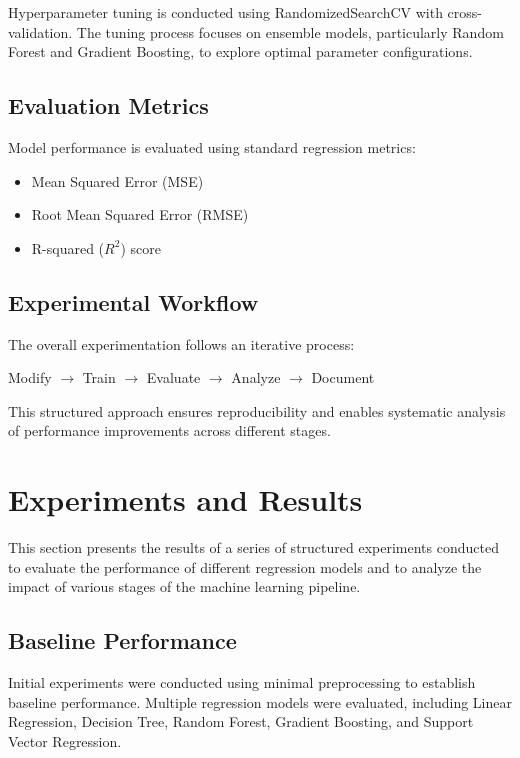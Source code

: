 \documentclass[conference]{IEEEtran}
\begin{document}
Hyperparameter tuning is conducted using RandomizedSearchCV with cross-validation. The tuning process focuses on ensemble models, particularly Random Forest and Gradient Boosting, to explore optimal parameter configurations.

\subsection{Evaluation Metrics}

Model performance is evaluated using standard regression metrics:

\begin{itemize}
\item Mean Squared Error (MSE)
\item Root Mean Squared Error (RMSE)
\item R-squared ($R^2$) score
\end{itemize}

\subsection{Experimental Workflow}

The overall experimentation follows an iterative process:

\begin{center}
Modify $\rightarrow$ Train $\rightarrow$ Evaluate $\rightarrow$ Analyze $\rightarrow$ Document
\end{center}

This structured approach ensures reproducibility and enables systematic analysis of performance improvements across different stages.

\section{Experiments and Results}

This section presents the results of a series of structured experiments conducted to evaluate the performance of different regression models and to analyze the impact of various stages of the machine learning pipeline.

\subsection{Baseline Performance}

Initial experiments were conducted using minimal preprocessing to establish baseline performance. Multiple regression models were evaluated, including Linear Regression, Decision Tree, Random Forest, Gradient Boosting, and Support Vector Regression.
\end{document}

